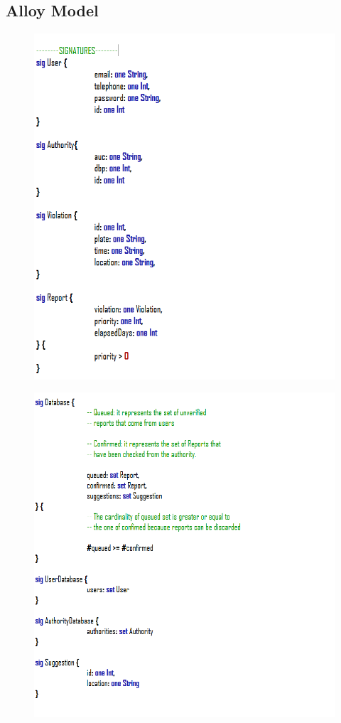 \documentclass[12pt,a4paper]{article}
\begin{document}
\subsection{Alloy Model}
\begin{figure}[H]
				\centering
				\includegraphics[width=1\linewidth]{images/exports/user/Sig1.png}
				\label{fig:signatures}
			\end{figure}
\begin{figure}[H]
				\centering
				\includegraphics[width=1\linewidth]{images/exports/user/Sig2.png}
				\label{fig:signatures}
			\end{figure}
\end{document}
